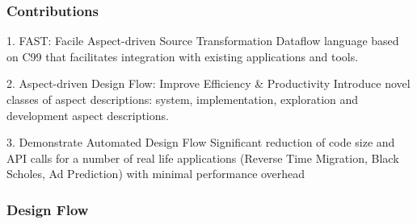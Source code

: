 \begin{frame}
  \frametitle{Contributions}
  \begin{beamerboxesrounded}{1. FAST: Facile Aspect-driven Source Transformation}
    Dataflow language based on C99 that facilitates integration with
    existing applications and tools.
  \end{beamerboxesrounded}

  \begin{beamerboxesrounded}{2. Aspect-driven Design Flow: Improve Efficiency \& Productivity}
    Introduce novel classes of aspect descriptions: system,
    implementation, exploration and development aspect descriptions.
  \end{beamerboxesrounded}

  \begin{beamerboxesrounded}{3. Demonstrate Automated Design Flow}
    Significant reduction of code size and API calls for a number of
    real life applications (Reverse Time Migration, Black Scholes, Ad
    Prediction) with minimal performance overhead
  \end{beamerboxesrounded}
\end{frame}

\begin{frame}
  \frametitle{Design Flow}
  \vspace{-0.3cm}
  \begin{figure}
    \centering
    \def\svgwidth{0.88\textwidth}
    
  \end{figure}
\end{frame}
